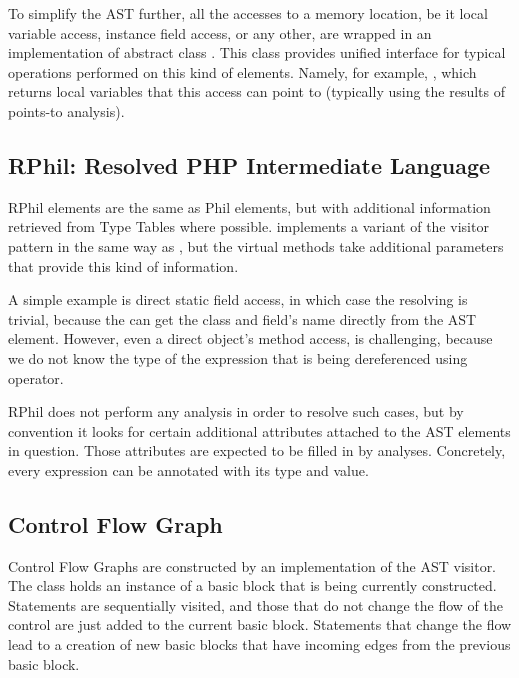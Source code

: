         To simplify the AST further, all the accesses to a memory location, be 
        it local variable access, instance field access, or any other, are 
        wrapped in an implementation of abstract class . 
        This class provides unified interface for typical operations performed 
        on this kind of elements. Namely, for example, , 
        which returns local variables that this access can point to (typically using 
        the results of points-to analysis).
        
        \subsection{RPhil: Resolved PHP Intermediate Language}
        
        RPhil elements are the same as Phil elements, but with additional 
        information retrieved from Type Tables where possible. 
         implements a variant 
        of the visitor pattern in the same way as , but 
        the virtual  methods take additional parameters 
        that provide this kind of information.
        
        A simple example is direct static field access, in which 
        case the resolving is trivial, because the  
        can get the class and field's name directly from the AST element. 
        However, even a direct object's method access, is challenging, 
        because we do not know the type of the expression that is 
        being dereferenced using \code{->} operator.
        
        RPhil does not perform any analysis in order to resolve such 
        cases, but by convention it looks for certain additional 
        attributes attached to the AST elements in question. Those 
        attributes are expected to be filled in by analyses. Concretely, 
        every expression can be annotated with its type and value.
    
        \subsection{Control Flow Graph}
        
        Control Flow Graphs are constructed by an implementation of the 
        AST visitor. The class holds an instance of a basic block that 
        is being currently constructed. Statements are sequentially visited, 
        and those that do not change the flow of the control are just added 
        to the current basic block. Statements that change the flow lead to 
        a creation of new basic blocks that have incoming edges from the 
        previous basic block.
        
